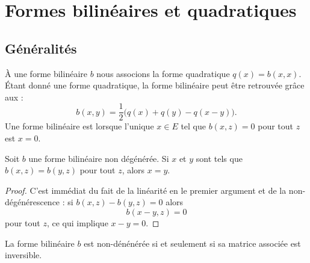 \section{Formes bilinéaires et quadratiques}
\label{SecTQkRXIu}

\subsection{Généralités}

À une forme bilinéaire \( b\) nous associons la forme quadratique \( q(x)=b(x,x)\). Étant donné une forme quadratique, la forme bilinéaire peut être retrouvée grâce aux  :
\begin{equation}    \label{EqMrbsop}
    b(x,y)=\frac{ 1 }{2}\big( q(x)+q(y)-q(x-y) \big).
\end{equation}
Une forme bilinéaire est  lorsque l'unique \( x\in E\) tel que \( b(x,z)=0\) pour tout \( z\) est \( x=0\).

\begin{lemma}   \label{LemyKJpVP}
    Soit \( b\) une forme bilinéaire non dégénérée. Si \( x\) et \( y\) sont tels que \( b(x,z)=b(y,z)\) pour tout \( z\), alors \( x=y\).
\end{lemma}

\begin{proof}
    C'est immédiat du fait de la linéarité en le premier argument et de la non-dégénérescence : si \( b(x,z)-b(y,z)=0\) alors
    \begin{equation}
        b(x-y,z)=0
    \end{equation}
    pour tout \( z\), ce qui implique \( x-y=0\).
\end{proof}

\begin{proposition}
    La forme bilinéaire \( b\) est non-dénénérée si et seulement si sa matrice associée est inversible.
\end{proposition}

